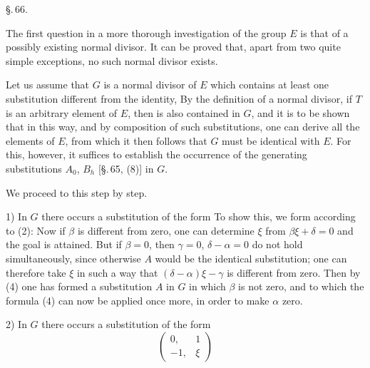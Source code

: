 
\begin{center}
\S.\,66.\\
\end{center}

The first question in a more thorough investigation of the group $E$ is that of a possibly existing normal divisor. It can be proved that, apart from two quite simple exceptions, no such normal divisor exists.

Let us assume that $G$ is a normal divisor of $E$ which contains at least one substitution different from the identity,
By the definition of a normal divisor, if $T$ is an arbitrary element of $E$, then
is also contained in $G$, and it is to be shown that in this way, and by composition of such substitutions, one can derive all the elements of $E$, from which it then follows that $G$ must be identical with $E$. For this, however, it suffices to establish the occurrence of the generating substitutions $A_0$, $B_h$ [\S.\,65, (8)] in $G$.

We proceed to this step by step.

1) In $G$ there occurs a substitution of the form
To show this, we form according to (2):
Now if $\beta$ is different from zero, one can determine $\xi$ from $\beta\xi+\delta=0$ and the goal is attained. But if $\beta=0$, then $\gamma=0$, $\delta-\alpha=0$ do not hold simultaneously, since otherwise $A$ would be the identical substitution; one can therefore take $\xi$ in such a way that $(\delta-\alpha)\xi-\gamma$ is different from zero. Then by (4) one has formed a substitution $A$ in $G$ in which $\beta$ is not zero, and to which the formula (4) can now be applied once more, in order to make $\alpha$ zero.

2) In $G$ there occurs a substitution of the form
\[
\begin{pmatrix} 0, & 1 \\ -1, & \xi \end{pmatrix}
\]
